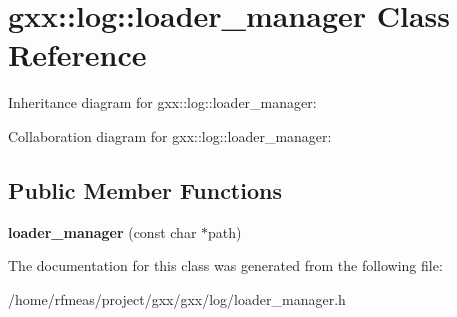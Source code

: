 \hypertarget{classgxx_1_1log_1_1loader__manager}{}\section{gxx\+:\+:log\+:\+:loader\+\_\+manager Class Reference}
\label{classgxx_1_1log_1_1loader__manager}


Inheritance diagram for gxx\+:\+:log\+:\+:loader\+\_\+manager\+:


Collaboration diagram for gxx\+:\+:log\+:\+:loader\+\_\+manager\+:
\subsection*{Public Member Functions}
\begin{DoxyCompactItemize}
\item 
{\bfseries loader\+\_\+manager} (const char $\ast$path)\hypertarget{classgxx_1_1log_1_1loader__manager_adea5a43f2382dfb0c061ec9bbe878ff5}{}\label{classgxx_1_1log_1_1loader__manager_adea5a43f2382dfb0c061ec9bbe878ff5}

\end{DoxyCompactItemize}


The documentation for this class was generated from the following file\+:\begin{DoxyCompactItemize}
\item 
/home/rfmeas/project/gxx/gxx/log/loader\+\_\+manager.\+h\end{DoxyCompactItemize}
